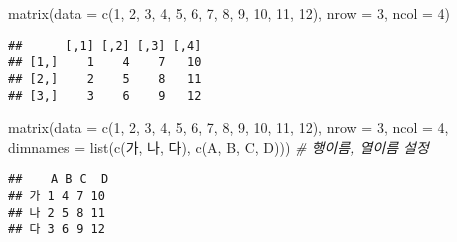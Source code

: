 \documentclass[
  12,
]{article}
\newenvironment{Shaded}{\begin{snugshade}}{\end{snugshade}}
\newcommand{\AttributeTok}[1]{\textcolor[rgb]{0.77,0.63,0.00}{#1}}
\newcommand{\CommentTok}[1]{\textcolor[rgb]{0.56,0.35,0.01}{\textit{#1}}}
\newcommand{\DecValTok}[1]{\textcolor[rgb]{0.00,0.00,0.81}{#1}}
\newcommand{\FunctionTok}[1]{\textcolor[rgb]{0.00,0.00,0.00}{#1}}
\newcommand{\NormalTok}[1]{#1}
\newcommand{\StringTok}[1]{\textcolor[rgb]{0.31,0.60,0.02}{#1}}
\begin{document}
\begin{Shaded}
\begin{Highlighting}[]
\FunctionTok{matrix}\NormalTok{(}\AttributeTok{data =} \FunctionTok{c}\NormalTok{(}\DecValTok{1}\NormalTok{, }\DecValTok{2}\NormalTok{, }\DecValTok{3}\NormalTok{, }\DecValTok{4}\NormalTok{, }\DecValTok{5}\NormalTok{, }\DecValTok{6}\NormalTok{, }\DecValTok{7}\NormalTok{, }\DecValTok{8}\NormalTok{, }\DecValTok{9}\NormalTok{, }\DecValTok{10}\NormalTok{, }\DecValTok{11}\NormalTok{, }\DecValTok{12}\NormalTok{), }\AttributeTok{nrow =} \DecValTok{3}\NormalTok{, }\AttributeTok{ncol =} \DecValTok{4}\NormalTok{)}
\end{Highlighting}
\end{Shaded}

\begin{verbatim}
##      [,1] [,2] [,3] [,4]
## [1,]    1    4    7   10
## [2,]    2    5    8   11
## [3,]    3    6    9   12
\end{verbatim}

\begin{Shaded}
\begin{Highlighting}[]
\FunctionTok{matrix}\NormalTok{(}\AttributeTok{data =} \FunctionTok{c}\NormalTok{(}\DecValTok{1}\NormalTok{, }\DecValTok{2}\NormalTok{, }\DecValTok{3}\NormalTok{, }\DecValTok{4}\NormalTok{, }\DecValTok{5}\NormalTok{, }\DecValTok{6}\NormalTok{, }\DecValTok{7}\NormalTok{, }\DecValTok{8}\NormalTok{, }\DecValTok{9}\NormalTok{, }\DecValTok{10}\NormalTok{, }\DecValTok{11}\NormalTok{, }\DecValTok{12}\NormalTok{), }\AttributeTok{nrow =} \DecValTok{3}\NormalTok{, }\AttributeTok{ncol =} \DecValTok{4}\NormalTok{, }\AttributeTok{dimnames =} \FunctionTok{list}\NormalTok{(}\FunctionTok{c}\NormalTok{(}\StringTok{\textquotesingle{}가\textquotesingle{}}\NormalTok{, }\StringTok{\textquotesingle{}나\textquotesingle{}}\NormalTok{, }\StringTok{\textquotesingle{}다\textquotesingle{}}\NormalTok{), }\FunctionTok{c}\NormalTok{(}\StringTok{\textquotesingle{}A\textquotesingle{}}\NormalTok{, }\StringTok{\textquotesingle{}B\textquotesingle{}}\NormalTok{, }\StringTok{\textquotesingle{}C\textquotesingle{}}\NormalTok{, }\StringTok{\textquotesingle{}D\textquotesingle{}}\NormalTok{))) }\CommentTok{\# 행이름, 열이름 설정}
\end{Highlighting}
\end{Shaded}

\begin{verbatim}
##    A B C  D
## 가 1 4 7 10
## 나 2 5 8 11
## 다 3 6 9 12
\end{verbatim}
\end{document}
